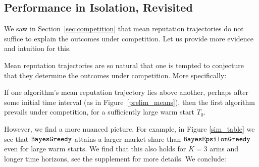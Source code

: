 \documentclass[../competing_bandits_with_appendix.tex]{subfiles}
\begin{document}
\subsection{Performance in Isolation, Revisited}\label{sec:revisited}


We saw in Section~\ref{sec:competition} that mean reputation trajectories do not suffice to explain the outcomes under competition. Let us provide more evidence and intuition for this.

Mean reputation trajectories are so natural that one is tempted to conjecture that they determine the outcomes under competition. More specifically:
\begin{conjecture}\label{conj:mean-trajectories}
If one algorithm's mean reputation trajectory lies above another, perhaps after some initial time interval (\eg as in Figure~\ref{prelim_means}), then the first algorithm prevails under competition, for a sufficiently large warm start $T_0$.
\end{conjecture}

However, we find a more nuanced picture. For example, in Figure \ref{sim_table} we see that $\mathtt{BayesGreedy}$ attains a larger market share than $\mathtt{BayesEpsilonGreedy}$ even for large warm starts. We find that this also holds for $K = 3$ arms and longer time horizons, see the supplement for more details. We conclude:
\end{document}
